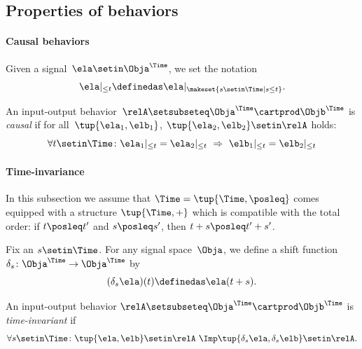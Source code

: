 \subsection{Properties of behaviors}

\paragraph{Causal behaviors}

Given a signal~$\ela \setin \Obja^\Time$, we set the notation
\begin{equation}
    \ela \vert_{\leq t} \definedas \ela \vert_{\makeset{ s \setin \Time \mid s \leq t}}.
\end{equation}

\begin{definition}\label{def:causal-io}
    An input-output behavior~$\relA \setsubseteq \Obja^\Time \cartprod \Objb^\Time$ is \emph{causal} if for all~$\tup{\ela_1, \elb_1}$, $\tup{\ela_2, \elb_2} \setin \relA$ holds:
    \begin{equation}
        \forall t \setin \Time\colon \ela_1 \vert_{ \leq t} = \ela_2 \vert_{ \leq t} \ \Rightarrow \ \elb_1 \vert_{ \leq t} = \elb_2 \vert_{ \leq t}
    \end{equation}
\end{definition}


\paragraph{Time-invariance}

In this subsection we assume that $\Time = \tup{\Time, \posleq}$ comes equipped with a  structure $\tup{\Time, +}$ which is compatible with the total order: if $t \posleq t'$ and $s \posleq s'$, then $t + s \posleq t' + s'$.

Fix an $s \setin \Time$.
For any signal space~$\Obja$, we define a shift function~$\delta_s\colon \Obja^\Time \to \Obja^\Time$ by
\begin{equation}
    (\delta_s \ela)(t)
    \definedas \ela(t + s).
\end{equation}

\begin{definition}\label{def:behavior-time-invariant}
    An input-output behavior $\relA \setsubseteq \Obja^\Time \cartprod \Objb^\Time$ is \emph{time-invariant} if
    \begin{equation}
        \forall s \setin \Time\colon \tup{\ela, \elb} \setin \relA \ \Imp \tup{\delta_s \ela, \delta_s \elb} \setin \relA.
    \end{equation}
\end{definition}


